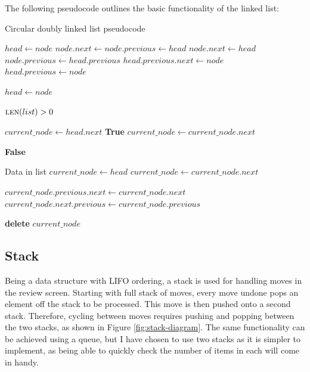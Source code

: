 \documentclass[../main/main.tex]{subfiles}
\begin{document}
The following pseudocode outlines the basic functionality of the linked list:

\begin{algorithm}[H]
\caption{Circular doubly linked list pseudocode}
\begin{algorithmic}
            \State $head \gets node$
            \State $node.next \gets node.previous \gets head$
        \Else
            \State $node.next \gets head$
            \State $node.previous \gets head.previous$
            \State $head.previous.next \gets node$
            \State $head.previous \gets node$

            \bigskip

            \State $head \gets node$
        \EndIf
    \EndFunction

    \bigskip

    \State \Require $\Call{len}{list} > 0$

        \State $current\_node \gets head.next$
                \State \Return \textbf{True}
            \EndIf
            \State $current\_node \gets current\_node.next$
        \EndWhile

        \State \Return \textbf{False}
    \EndFunction

    \bigskip

    \State \Require Data in list
        \State $current\_node \gets head$
            \State $current\_node \gets current\_node.next$
        \EndWhile

        \bigskip

        \State $current\_node.previous.next \gets current\_node.next$
        \State $current\_node.next.previous \gets current\_node.previous$

        \bigskip

        \State \textbf{delete} $current\_node$
    \EndFunction
\end{algorithmic}
\end{algorithm}

\subsection{Stack}
Being a data structure with LIFO ordering, a stack is used for handling moves in the review screen. Starting with full stack of moves, every move undone pops an element off the stack to be processed. This move is then pushed onto a second stack. Therefore, cycling between moves requires pushing and popping between the two stacks, as shown in Figure \ref{fig:stack-diagram}. The same functionality can be achieved using a queue, but I have chosen to use two stacks as it is simpler to implement, as being able to quickly check the number of items in each will come in handy.
\end{document}
